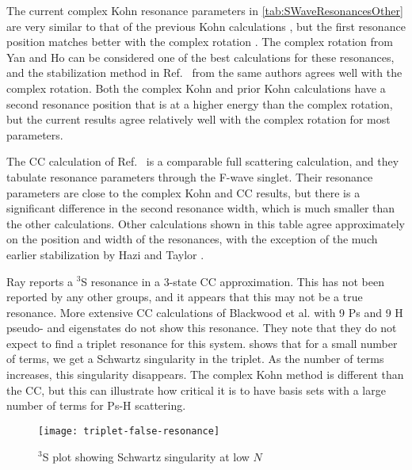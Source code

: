 \documentclass[Dissertation.tex]{subfiles}
\begin{document}

The current complex Kohn resonance parameters in \cref{tab:SWaveResonancesOther} are very similar to that of the previous Kohn calculations \cite{VanReeth2004}, but the first resonance position matches better with the complex rotation \cite{Yan1999}. The complex rotation from Yan and Ho can be considered one of the best calculations for these resonances, and the stabilization method in Ref.~\cite{Yan2003} from the same authors agrees well with the complex rotation. Both the complex Kohn and prior Kohn calculations have a second resonance position that is at a higher energy than the complex rotation, but the current results agree relatively well with the complex rotation for most parameters.

The CC calculation of Ref.~\cite{Walters2004} is a comparable full scattering calculation, and they tabulate resonance parameters through the F-wave singlet. Their resonance parameters are close to the complex Kohn and CC results, but there is a significant difference in the second resonance width, which is much smaller than the other calculations. Other calculations shown in this table agree approximately on the position and width of the resonances, with the exception of the much earlier stabilization by Hazi and Taylor \cite{Hazi1970}.


Ray \cite{Ray2006} reports a $^3$S resonance in a 3-state CC approximation. This has not been reported by any other groups, and it appears that this may not be a true resonance. 
More extensive CC calculations of Blackwood et al. \cite{Blackwood2002} with 9 Ps and 9 H pseudo- and eigenstates do not show this resonance. They note that they do not expect to find a triplet resonance for this system.  shows that for a small number of terms, we get a Schwartz singularity in the triplet. As the number of terms increases, this singularity disappears. The complex Kohn method is different than the CC, but this can illustrate how critical it is to have basis sets with a large number of terms for Ps-H scattering.

\begin{figure}[H]
	\centering
	\texttt{[image: triplet-false-resonance]}
	\caption{$^3$S plot showing Schwartz singularity at low $N$}
	\label{fig:triplet-false-resonance}
\end{figure}





\biblio
\end{document}
